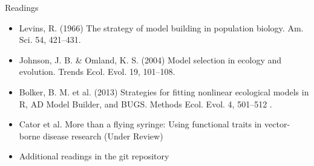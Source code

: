\documentclass[xcolor=x11names,compress]{beamer}
\renewcommand{\(}{\begin{columns}}
\renewcommand{\)}{\end{columns}}
\newcommand{\<}[1]{\begin{column}{#1}}
\renewcommand{\>}{\end{column}}
\begin{document}
\begin{frame}{Readings}

\begin{itemize}

\item Levins, R. (1966) The strategy of model building in population 
biology. Am. Sci. 54, 421--431.  

\item Johnson, J. B. \& Omland, K. S. (2004) Model selection in ecology 
and evolution. Trends Ecol. Evol. 19, 101--108. 

\item Bolker, B. M. et al.  (2013) Strategies for fitting nonlinear ecological models in R, AD Model Builder, and BUGS. Methods Ecol. Evol. 4, 501--512 .

\item Cator et al. More than a flying syringe: Using functional traits in vector-borne disease research (Under Review)

\item Additional readings in the git repository

\end{itemize}
\end{frame}
\end{document}
